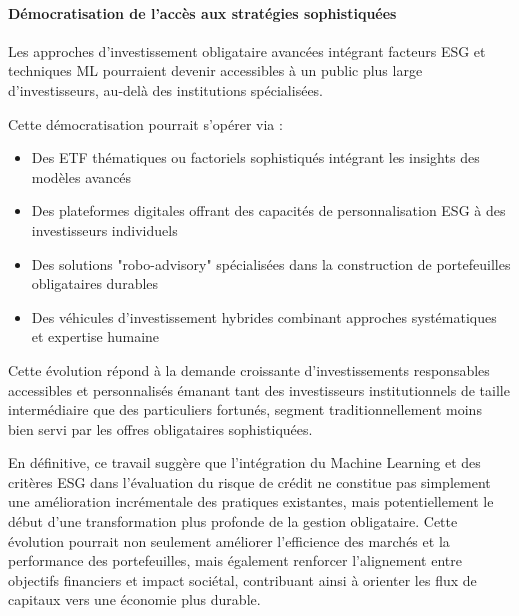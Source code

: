 \paragraph{Démocratisation de l'accès aux stratégies sophistiquées} 

Les approches d'investissement obligataire avancées intégrant facteurs ESG et techniques ML pourraient devenir accessibles à un public plus large d'investisseurs, au-delà des institutions spécialisées.

Cette démocratisation pourrait s'opérer via :
\begin{itemize}
    \item Des ETF thématiques ou factoriels sophistiqués intégrant les insights des modèles avancés
    \item Des plateformes digitales offrant des capacités de personnalisation ESG à des investisseurs individuels
    \item Des solutions "robo-advisory" spécialisées dans la construction de portefeuilles obligataires durables
    \item Des véhicules d'investissement hybrides combinant approches systématiques et expertise humaine
\end{itemize}

Cette évolution répond à la demande croissante d'investissements responsables accessibles et personnalisés émanant tant des investisseurs institutionnels de taille intermédiaire que des particuliers fortunés, segment traditionnellement moins bien servi par les offres obligataires sophistiquées.

En définitive, ce travail suggère que l'intégration du Machine Learning et des critères ESG dans l'évaluation du risque de crédit ne constitue pas simplement une amélioration incrémentale des pratiques existantes, mais potentiellement le début d'une transformation plus profonde de la gestion obligataire. Cette évolution pourrait non seulement améliorer l'efficience des marchés et la performance des portefeuilles, mais également renforcer l'alignement entre objectifs financiers et impact sociétal, contribuant ainsi à orienter les flux de capitaux vers une économie plus durable.